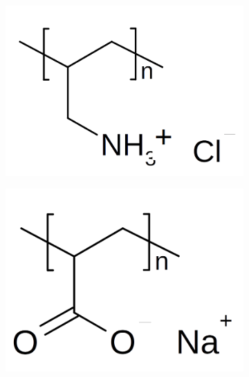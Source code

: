 \documentclass[journal=mamobx,manuscript=article]{achemso}
\begin{document}
\begin{figure}[H]
    \begin{subfigure}[b]{0.35\textwidth}
        \includegraphics[scale=0.35]{fig1A.png}
        \caption{}
        \label{fig:A}
    \end{subfigure}
    \begin{subfigure}[b]{0.35\textwidth}
        \includegraphics[scale=0.35]{fig1B.png}
        \caption{}
        \label{fig:B}
    \end{subfigure}
    \begin{subfigure}[b]{0.35\textwidth}

\end{subfigure}
\end{figure}
\end{document}
